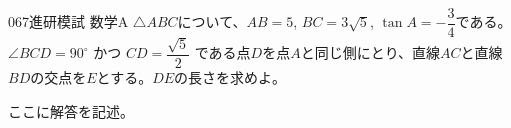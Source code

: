\begin{prob}{067}{}{進研模試 数学A}
 $\triangle{ABC}$について、$AB=5$, $BC=3\sqrt{5}$, $\tan A=-\dfrac{3}{4}$である。$\angle{BCD}=90^\circ$ かつ $CD=\dfrac{\sqrt{5}}{2}$ である点$D$を点$A$と同じ側にとり、直線$AC$と直線$BD$の交点を$E$とする。$DE$の長さを求めよ。
\end{prob}
ここに解答を記述。